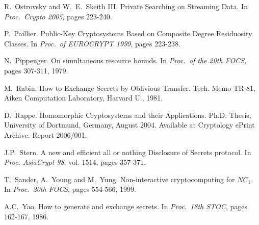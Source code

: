\documentclass[11pt]{article}
\begin{document}
\begin{thebibliography}{10}
R.~Ostrovsky and W.~E.~Skeith III.
\newblock  Private Searching on
Streaming Data.
\newblock In {\em Proc.\ Crypto 2005}, pages 223-240.

P.~Paillier.
\newblock  Public-Key Cryptosystems Based on Composite Degree Residuosity
Classes.
\newblock  In {\em Proc.\ of EUROCRYPT 1999}, pages 223-238.

\newblock N.~Pippenger.
\newblock On simultaneous resource bounds.
\newblock In {\em Proc.\ of the 20th FOCS}, pages 307-311, 1979.

M.~Rabin.
\newblock How to Exchange Secrets by Oblivious Transfer.
\newblock Tech. Memo TR-81, Aiken Computation Laboratory, Harvard U., 1981.


\newblock D.~Rappe.
\newblock Homomorphic Cryptosystems and their Applications.
\newblock Ph.D. Thesis, University of Dortmund, Germany, August 2004.
Available at Cryptology ePrint Archive: Report 2006/001.

J.P.~Stern.
\newblock A new and efficient all or nothing Disclosure of Secrets protocol.
\newblock In {\em Proc. AsiaCrypt 98}, vol. 1514, pages 357-371.

T.~Sander, A.~Young and M.~Yung.
\newblock Non-interactive cryptocomputing for $NC_1$.
\newblock In {\em Proc.\ 20th FOCS}, pages 554-566, 1999.

A.C.~Yao.
\newblock How to generate and exchange secrets.
\newblock In {\em Proc.\ 18th STOC}, pages 162-167, 1986.

\end{thebibliography}
\end{document}
